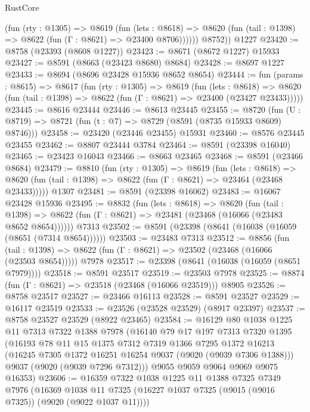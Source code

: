 \begin{lexlean}{RustCore}
\begin{coremodule}
            (fun (rty : @1305) =>
            @8619
              (fun (lets : @8618) =>
              @8620 (fun (tail : @1398) => @8622 (fun (Γ : @8621) => @23400 @8706))))))
        @8752))
    @1227
@23420 := @8758 (@23393 (@8608 @1227))
@23423 := @8671 (@8672 @1227) @15933
@23427 := @8591 (@8663 (@23423 @8680) @8684)
@23428 := @8697 @1227
@23433 := @8694 (@8696 @23428 @15936 @8652 @8654)
@23444 := fun (params : @8615) =>
  @8617
    (fun (rty : @1305) =>
    @8619
      (fun (lets : @8618) =>
      @8620 (fun (tail : @1398) => @8622 (fun (Γ : @8621) => @23400 (@23427 @23433)))))
@23445 := @8616 @23444
@23446 := @8613 @23445
@23455 := @8720
    (fun (U : @8719) => @8721 (fun (t : @7) => @8729 (@8591 (@8735 @15933 @8609) @8746)))
@23458 := @23420 (@23446 @23455) @15931
@23460 := @8576 @23445 @23455
@23462 := @8807 @23444 @3784
@23464 := @8591 (@23398 @16040)
@23465 := @23423 @16043
@23466 := @8663 @23465
@23468 := @8591 (@23466 @8684)
@23479 := @8810
    (fun (rty : @1305) =>
    @8619
      (fun (lets : @8618) =>
      @8620 (fun (tail : @1398) => @8622 (fun (Γ : @8621) => @23464 (@23468 @23433)))))
    @1307
@23481 := @8591 (@23398 @16062)
@23483 := @16067 @23428 @15936
@23495 := @8832
    (fun (lets : @8618) =>
    @8620
      (fun (tail : @1398) =>
      @8622 (fun (Γ : @8621) => @23481 (@23468 (@16066 (@23483 @8652 @8654))))))
    @7313
@23502 := @8591 (@23398 (@8641 (@16038 (@16059 (@8651 (@7314 @8654))))))
@23503 := @23483 @7313
@23512 := @8856
    (fun (tail : @1398) => @8622 (fun (Γ : @8621) => @23502 (@23468 (@16066 (@23503 @8654)))))
    @7978
@23517 := @23398 (@8641 (@16038 (@16059 (@8651 @7979))))
@23518 := @8591 @23517
@23519 := @23503 @7978
@23525 := @8874 (fun (Γ : @8621) => @23518 (@23468 (@16066 @23519))) @8905
@23526 := @8758 @23517
@23527 := @23466 @16113
@23528 := @8591 @23527
@23529 := @16117 @23519
@23533 := @23526 (@23528 @23529) (@8917 @23397)
@23537 := @8758 @23527 @23529 (@8922 @23465)
@23584 := @16129
    @80
    @1038
    @1225
    @11
    @7313
    @7322
    @1388
    @7978
    (@16140
      @79
      @17
      @197
      @7313
      @7320
      @1395
      (@16193
        @78
        @11
        @15
        @1375
        @7312
        @7319
        @1366
        @7295
        @1372
        @16213
        (@16245 @7305 @1372 @16251 @16254 @9037 (@9020 (@9039 @7306 @1388)))
        @9037
        (@9020 (@9039 @7296 @7312)))
      @9055
      @9059
      @9064
      @9069
      @9075
      @16353)
@23606 := @16359
    @7322
    @1038
    @1225
    @11
    @1388
    @7325
    @7349
    @7976
    (@16369 @1038 @11 @7325 (@16227 @1037 @7325 (@9015 (@9016 @7325)) (@9020 (@9022 @1037 @11))))

\end{coremodule}
\end{lexlean}
